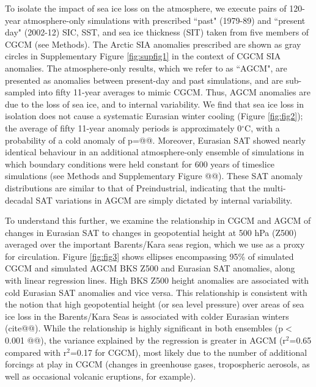 \documentclass{nature}
\begin{document}
To isolate the impact of sea ice loss on the atmosphere, we execute pairs of 120-year atmosphere-only simulations with prescribed ``past" (1979-89) and ``present day" (2002-12) SIC, SST, and sea ice thickness (SIT) taken from five members of CGCM (see Methods). The Arctic SIA anomalies prescribed are shown as gray circles in Supplementary Figure \ref{fig:supfig1} in the context of CGCM SIA anomalies. The atmosphere-only results, which we refer to as ``AGCM", are presented as anomalies between present-day and past simulations, and are sub-sampled into fifty 11-year averages to mimic CGCM. Thus, AGCM anomalies are due to the loss of sea ice, and to internal variability. We find that sea ice loss in isolation does not cause a systematic Eurasian winter cooling (Figure \ref{fig:fig2}); the average of fifty 11-year anomaly periods is approximately 0$^\circ$C, with a probability of a cold anomaly of p=@@. Moreover, Eurasian SAT showed nearly identical behaviour in an additional atmosphere-only ensemble of simulations in which boundary conditions were held constant for 600 years of timeslice simulations (see Methods and Supplementary Figure @@). These SAT anomaly distributions are similar to that of Preindustrial, indicating that the multi-decadal SAT variations in AGCM are simply dictated by internal variability.   %

To understand this further, we examine the relationship in CGCM and AGCM of changes in Eurasian SAT to changes in geopotential height at 500 hPa (Z500) averaged over the important Barents/Kara seas region, which we use as a proxy for circulation. Figure \ref{fig:fig3} shows ellipses encompassing 95\% of simulated CGCM and simulated AGCM BKS Z500 and Eurasian SAT anomalies, along with linear regression lines. High BKS Z500 height anomalies are associated with cold Eurasian SAT anomalies and vice versa. This relationship is consistent with the notion that high geopotential height (or sea level pressure) over areas of sea ice loss in the Barents/Kara Seas is associated with colder Eurasian winters (cite@@). While the relationship is highly significant in both ensembles (p$<$0.001 @@), the variance explained by the regression is greater in AGCM (r$^2$=0.65 compared with r$^2$=0.17 for CGCM), most likely due to the number of additional forcings at play in CGCM (changes in greenhouse gases, tropospheric aerosols, as well as occasional volcanic eruptions, for example).
\end{document}
